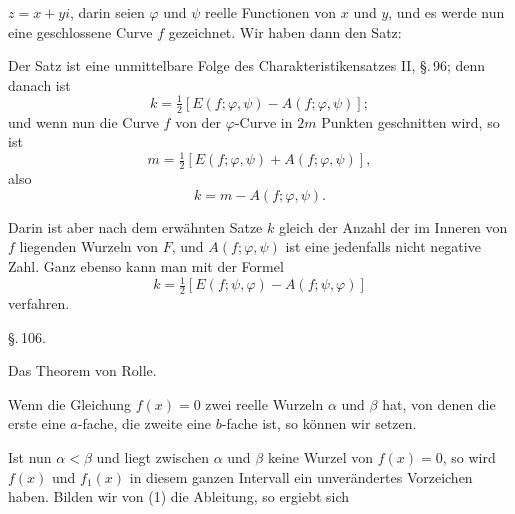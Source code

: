 $z = x + yi$, darin seien $\varphi$ und $\psi$ reelle Functionen von $x$ und
$y$, und es werde nun eine geschlossene Curve $f$ gezeichnet. Wir haben dann
den Satz:


Der Satz ist eine unmittelbare Folge des Charakteristikensatzes II,
\S.\,96; denn danach ist
\[
k = \tfrac{1}{2}[E(f;\varphi,\psi) - A(f;\varphi,\psi)];
\]
und wenn nun die Curve $f$ von der $\varphi$-Curve in $2m$ Punkten
geschnitten wird, so ist
\[
m = \tfrac{1}{2}[E(f;\varphi,\psi) + A(f;\varphi,\psi)],
\]
also
\[
k = m - A(f;\varphi,\psi).
\]

Darin ist aber nach dem erwähnten Satze $k$ gleich der Anzahl der im Inneren
von $f$ liegenden Wurzeln von $F$, und $A(f;\varphi,\psi)$ ist eine
jedenfalls nicht negative Zahl. Ganz ebenso kann man mit der Formel
\[
k = \tfrac{1}{2}[E(f;\psi,\varphi) - A(f;\psi,\varphi)]
\]
verfahren.

\begin{center}
\S.\,106.

Das Theorem von Rolle.
\end{center}

Wenn die Gleichung $f(x) = 0$ zwei reelle Wurzeln $\alpha$ und $\beta$ hat,
von denen die erste eine $a$-fache, die zweite eine $b$-fache ist, so können
wir
setzen.

Ist nun $\alpha < \beta$ und liegt zwischen $\alpha$ und $\beta$ keine
Wurzel von $f(x) = 0$, so wird $f(x)$ und $f_1(x)$ in diesem ganzen
Intervall ein unverändertes Vorzeichen haben. Bilden wir von (1) die
Ableitung, so ergiebt sich
